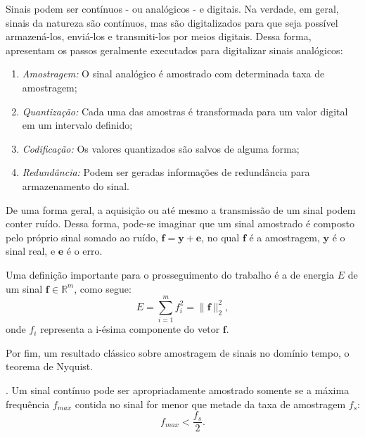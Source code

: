\documentclass[cic,tc]{iiufrgs}
\renewcommand{\vec}[1]{\bm{#1}}
\begin{document}
Sinais podem ser contínuos - ou analógicos - e digitais.
Na verdade, em geral, sinais da natureza são contínuos, mas são digitalizados 
para que seja possível armazená-los, enviá-los e transmiti-los por meios digitais.
Dessa forma, \citet{haykin2001sinais} apresentam os passos geralmente executados 
para digitalizar sinais analógicos:
\begin{enumerate}
    \item \emph{Amostragem:} O sinal analógico é amostrado com determinada taxa de amostragem;
    \item \emph{Quantização:} Cada uma das amostras é transformada para um valor digital em um intervalo definido;
    \item \emph{Codificação:} Os valores quantizados são salvos de alguma forma;
    \item \emph{Redundância:} Podem ser geradas informações de redundância para armazenamento do sinal.
\end{enumerate} 

De uma forma geral, a aquisição ou até mesmo a transmissão de um sinal podem conter ruído.
Dessa forma, pode-se imaginar que um sinal amostrado é composto pelo próprio sinal somado ao ruído,
$\vec{f} = \vec{y} + \vec{e}$, no qual $\vec{f}$ é a amostragem, $\vec{y}$ é o sinal real, 
e $\vec{e}$ é o erro.

Uma definição importante para o prosseguimento do trabalho é a de energia $E$ de um sinal $\vec{f} \in \mathbb{R}^m$, como segue:
\begin{equation}
    E = \sum_{i=1}^m f_i^2 = \lVert \vec{f} \rVert_2^2,
\end{equation}
onde $f_i$ representa a i-ésima componente do vetor $\vec{f}$.

Por fim, um resultado clássico sobre amostragem de sinais no domínio tempo, o teorema de Nyquist.
\begin{teorema}
    \cite{NyquistSampling}.
    Um sinal contínuo pode ser apropriadamente amostrado somente se a máxima frequência $f_{max}$ contida 
    no sinal for menor que metade da taxa de amostragem $f_s$:
    \begin{equation*}
        f_{max} < \frac{f_s}{2}.
    \end{equation*}
    \label{teo:nyquist}
\end{teorema}

\end{document}
